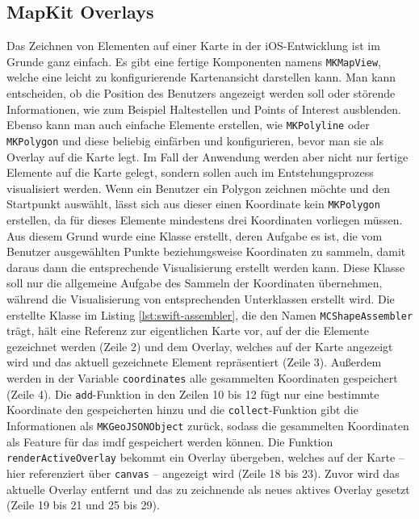 \subsection{MapKit Overlays}
Das Zeichnen von Elementen auf einer Karte in der iOS-Entwicklung ist im Grunde ganz einfach.
Es gibt eine fertige Komponenten namens \texttt{MKMapView}, welche eine leicht zu konfigurierende Kartenansicht darstellen kann.
Man kann entscheiden, ob die Position des Benutzers angezeigt werden soll oder störende Informationen, wie zum Beispiel Haltestellen und Points of Interest ausblenden.
Ebenso kann man auch einfache Elemente erstellen, wie \texttt{MKPolyline} oder \texttt{MKPolygon} und diese beliebig einfärben und konfigurieren, bevor man sie als Overlay auf die Karte legt.
Im Fall der Anwendung werden aber nicht nur fertige Elemente auf die Karte gelegt, sondern sollen auch im Entstehungsprozess visualisiert werden.
Wenn ein Benutzer ein Polygon zeichnen möchte und den Startpunkt auswählt, lässt sich aus dieser einen Koordinate kein \texttt{MKPolygon} erstellen, da für dieses Elemente mindestens drei Koordinaten vorliegen müssen.\pbreak%
%
Aus diesem Grund wurde eine Klasse erstellt, deren Aufgabe es ist, die vom Benutzer ausgewählten Punkte beziehungsweise Koordinaten zu sammeln, damit daraus dann die entsprechende Visualisierung erstellt werden kann.
Diese Klasse soll nur die allgemeine Aufgabe des Sammeln der Koordinaten übernehmen, während die Visualisierung von entsprechenden Unterklassen erstellt wird.
Die erstellte Klasse im Listing \ref{lst:swift-assembler}, die den Namen \texttt{MCShapeAssembler} trägt, hält eine Referenz zur eigentlichen Karte vor, auf der die Elemente gezeichnet werden (Zeile 2) und dem Overlay, welches auf der Karte angezeigt wird und das aktuell gezeichnete Element repräsentiert (Zeile 3).
Außerdem werden in der Variable \texttt{coordinates} alle gesammelten Koordinaten gespeichert (Zeile 4).
Die \texttt{add}-Funktion in den Zeilen 10 bis 12 fügt nur eine bestimmte Koordinate den gespeicherten hinzu und die \texttt{collect}-Funktion gibt die Informationen als \texttt{MKGeoJSONObject} zurück, sodass die gesammelten Koordinaten als Feature für das \acl{imdf} gespeichert werden können.
Die Funktion \texttt{renderActiveOverlay} bekommt ein Overlay übergeben, welches auf der Karte – hier referenziert über \texttt{canvas} – angezeigt wird (Zeile 18 bis 23).
Zuvor wird das aktuelle Overlay entfernt und das zu zeichnende als neues aktives Overlay gesetzt (Zeile 19 bis 21 und 25 bis 29).
